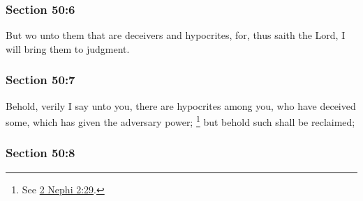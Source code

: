 
	\subsubsection{Section 50:6} %
		\label{DC50-6}

		But wo unto them that are deceivers and hypocrites, for, thus saith the Lord, I will bring them to judgment.


	\subsubsection{Section 50:7} %
		\label{DC50-7}

		Behold, verily I say unto you, there are hypocrites among you, who have deceived some, which has given the adversary power;%
			\footnote{%
				See \hyperref[2NEPHI-2-29]{2 Nephi 2:29}.
				}
		but behold such shall be reclaimed;


	\subsubsection{Section 50:8} %
		\label{DC50-8}

